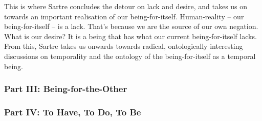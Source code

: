 This is where Sartre concludes the detour on lack and desire, and takes us on towards an important realisation of our being-for-itself. Human-reality -- our being-for-itself -- is a lack. That's because we are the source of our own negation. What is our desire? It is a being that has what our current being-for-itself lacks. From this, Sartre takes us onwards towards radical, ontologically interesting discussions on temporality and the ontology of the being-for-itself as a temporal being.

\subsubsection{Part III: Being-for-the-Other}

\subsubsection{Part IV: To Have, To Do, To Be}